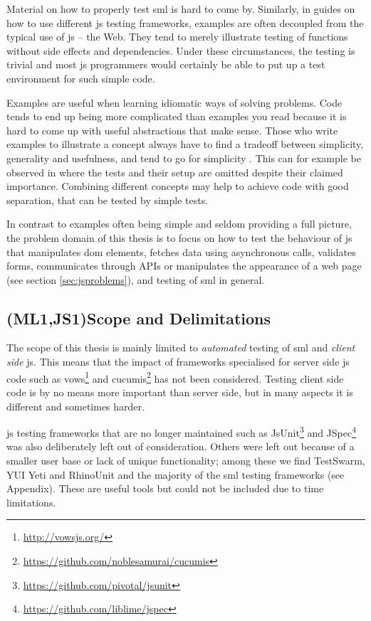 \documentclass[11pt]{article}
\begin{document}
Material on how to properly test \gls{sml} is hard to come by. Similarly, in guides on how to use different \gls{js} testing frameworks, examples are often decoupled from the typical use of \gls{js} -- the Web. They tend to merely illustrate testing of functions without side effects and dependencies. Under these circumstances, the testing is trivial and most \gls{js} programmers would certainly be able to put up a test environment for such simple code.

Examples are useful when learning idiomatic ways of solving problems. Code tends to end up being more complicated than examples you read because it is hard to come up with useful abstractions that make sense. Those who write examples to illustrate a concept always have to find a tradeoff between simplicity, generality and usefulness, and tend to go for simplicity \cite[questions~56-57]{Edelstam}. This can for example be observed in \cite[p.~13-45]{Refactoring} where the tests and their setup are omitted despite their claimed importance. Combining different concepts may help to achieve code with good separation, that can be tested by simple tests.

In contrast to examples often being simple and seldom providing a full picture, the problem domain of this thesis is to focus on how to test the behaviour of \gls{js} that manipulates \gls{dom} elements, fetches data using asynchronous calls, validates forms, communicates through APIs or manipulates the appearance of a web page (see section \ref{sec:jsproblems}), and testing of \gls{sml} in general.

\subsection{(ML1,JS1)Scope and Delimitations}

The scope of this thesis is mainly limited to \emph{automated} testing of \gls{sml} and \emph{client side} \gls{js}. This means that the impact of frameworks specialised for server side \gls{js} code such as vows\footnote{\url{http://vowsjs.org/}} and cucumis\footnote{\url{https://github.com/noblesamurai/cucumis}} has not been considered. Testing client side code is by no means more important than server side, but in many aspects it is different and sometimes harder.

\gls{js} testing frameworks that are no longer maintained such as JsUnit\footnote{\url{https://github.com/pivotal/jsunit}} and JSpec\footnote{\url{https://github.com/liblime/jspec}} was also deliberately left out of consideration. Others were left out because of a smaller user base or lack of unique functionality; among these we find TestSwarm, YUI Yeti and RhinoUnit and the majority of the \gls{sml} testing frameworks (see Appendix). These are useful tools but could not be included due to time limitations.
\end{document}

